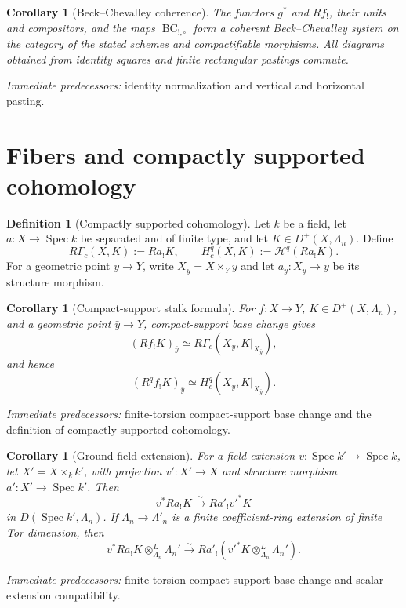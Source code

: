 \documentclass[10pt]{article}
\newtheorem{corollary}[theorem]{Corollary}
\theoremstyle{definition}
\newtheorem{definition}[theorem]{Definition}
\newcommand{\pred}[1]{\par\smallskip\begingroup\footnotesize\raggedright
\emph{Immediate predecessors:} #1.\par\endgroup}
\begin{document}
\begin{corollary}[Beck--Chevalley coherence]
The functors \(g^*\) and \(Rf_!\), their units and compositors, and the maps
\(\operatorname{BC}_{!,\square}\) form a coherent Beck--Chevalley system on
the category of the stated schemes and compactifiable morphisms.  All
diagrams obtained from identity squares and finite rectangular pastings
commute.
\end{corollary}
\pred{identity normalization and vertical and horizontal pasting}

\section{Fibers and compactly supported cohomology}

\begin{definition}[Compactly supported cohomology]
Let \(k\) be a field, let \(a:X\to\operatorname{Spec}k\) be separated and
of finite type, and let \(K\in D^+(X,\Lambda_n)\).  Define
\[
 R\Gamma_c(X,K):=Ra_!K,\qquad
 H_c^q(X,K):=\mathcal H^q(Ra_!K).
\]
For a geometric point \(\bar y\to Y\), write
\(X_{\bar y}=X\times_Y\bar y\) and let
\(a_{\bar y}:X_{\bar y}\to\bar y\) be its structure morphism.
\end{definition}

\begin{corollary}[Compact-support stalk formula]
For \(f:X\to Y\), \(K\in D^+(X,\Lambda_n)\), and a geometric point
\(\bar y\to Y\), compact-support base change gives
\[
 (Rf_!K)_{\bar y}\simeq
 R\Gamma_c(X_{\bar y},K|_{X_{\bar y}}),
\]
and hence
\[
 (R^qf_!K)_{\bar y}\simeq
 H_c^q(X_{\bar y},K|_{X_{\bar y}}).
\]
\end{corollary}
\pred{finite-torsion compact-support base change and the definition of compactly supported cohomology}

\begin{corollary}[Ground-field extension]
For a field extension \(v:\operatorname{Spec}k'\to\operatorname{Spec}k\),
let \(X'=X\times_kk'\), with projection \(v':X'\to X\) and structure
morphism \(a':X'\to\operatorname{Spec}k'\).  Then
\[
 v^*Ra_!K\xrightarrow{\sim}Ra'_!v'^*K
\]
in \(D(\operatorname{Spec}k',\Lambda_n)\).  If
\(\Lambda_n\to\Lambda'_n\) is a finite coefficient-ring extension of
finite Tor dimension, then
\[
 v^*Ra_!K\otimes_{\Lambda_n}^{L}\Lambda_n'
 \xrightarrow{\sim}
 Ra'_!(v'^*K\otimes_{\Lambda_n}^{L}\Lambda_n').
\]
\end{corollary}
\pred{finite-torsion compact-support base change and scalar-extension compatibility}
\end{document}
